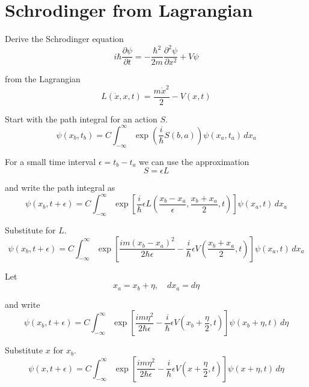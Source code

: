 

\section*{Schrodinger from Lagrangian}

Derive the Schrodinger equation
\begin{equation*}
i\hbar\frac{\partial\psi}{\partial t}=-\frac{\hbar^2}{2m}\frac{\partial^2\psi}{\partial x^2}+V\psi
\end{equation*}

from the Lagrangian
\begin{equation*}
L(\dot x,x,t)=\frac{m\dot x^2}{2}-V(x,t)
\end{equation*}

Start with the path integral for an action $S$.
\begin{equation*}
\psi(x_b,t_b)=C\int_{-\infty}^\infty\exp\left(\frac{i}{\hbar}S(b,a)\right)\psi(x_a,t_a)\,dx_a
\end{equation*}

For a small time interval $\epsilon=t_b-t_a$ we can use the approximation
\begin{equation*}
S=\epsilon L
\end{equation*}

and write the path integral as
\begin{equation*}
\psi(x_b,t+\epsilon)=C\int_{-\infty}^\infty
\exp\left[\frac{i}{\hbar}\epsilon L\left(\frac{x_b-x_a}{\epsilon},\frac{x_b+x_a}{2},t\right)\right]
\psi(x_a,t)\,dx_a
\end{equation*}

Substitute for $L$.
\begin{equation*}
\psi(x_b,t+\epsilon)=C\int_{-\infty}^\infty
\exp\left[\frac{im(x_b-x_a)^2}{2\hbar\epsilon}
-\frac{i}{\hbar}\epsilon V\left(\frac{x_b+x_a}{2},t\right)\right]\psi(x_a,t)\,dx_a
\end{equation*}

Let
\begin{equation*}
x_a=x_b+\eta,\quad dx_a=d\eta
\end{equation*}

and write
\begin{equation*}
\psi(x_b,t+\epsilon)=C\int_{-\infty}^\infty
\exp\left[\frac{im\eta^2}{2\hbar\epsilon}
-\frac{i}{\hbar}\epsilon V\left(x_b+\frac{\eta}{2},t\right)\right]\psi(x_b+\eta,t)\,d\eta
\end{equation*}

Substitute $x$ for $x_b$.
\begin{equation*}
\psi(x,t+\epsilon)=C\int_{-\infty}^\infty
\exp\left[\frac{im\eta^2}{2\hbar\epsilon}
-\frac{i}{\hbar}\epsilon V\left(x+\frac{\eta}{2},t\right)\right]\psi(x+\eta,t)\,d\eta
\end{equation*}

